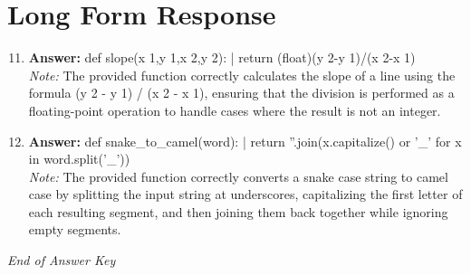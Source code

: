\documentclass[12pt]{article}
\begin{document}
\section*{Long Form Response}
\begin{enumerate}[label=\arabic*.]
\setcounter{enumi}{10}
\item \textbf{Answer:} def slope(x 1,y 1,x 2,y 2): | return (float)(y 2-y 1)/(x 2-x 1)
\\ \textit{Note:} The provided function correctly calculates the slope of a line using the formula (y 2 - y 1) / (x 2 - x 1), ensuring that the division is performed as a floating-point operation to handle cases where the result is not an integer.
\item \textbf{Answer:} def snake\_to\_camel(word): | return ''.join(x.capitalize() or '\_' for x in word.split('\_'))
\\ \textit{Note:} The provided function correctly converts a snake case string to camel case by splitting the input string at underscores, capitalizing the first letter of each resulting segment, and then joining them back together while ignoring empty segments.
\end{enumerate}

\vfill
\noindent\textit{End of Answer Key}
\end{document}
